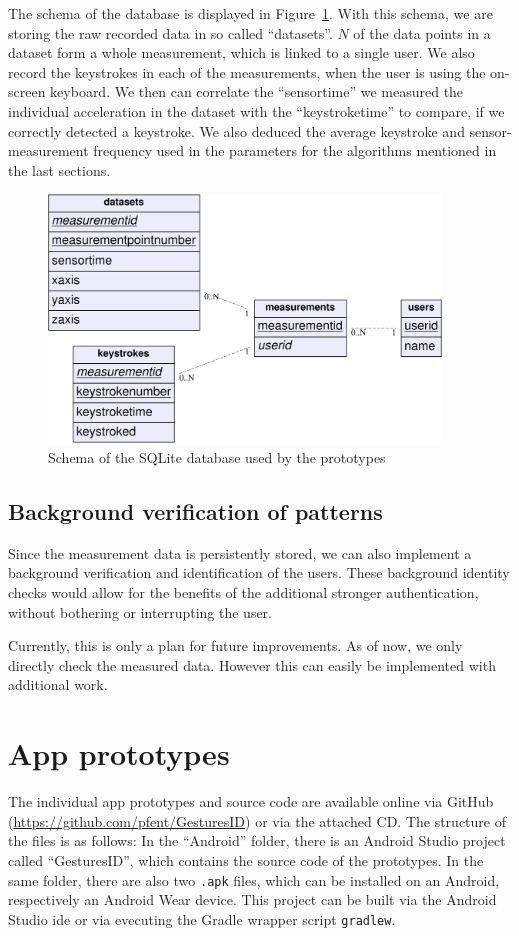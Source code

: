 The schema of the database is displayed in Figure~\ref{fig:dbschema}. With this schema, we are  storing the raw recorded data in so called ``datasets''. $N$ of the data points in a dataset form a whole measurement, which is linked to a single user. We also record the keystrokes in each of the measurements, when the user is using the on-screen keyboard. We then can correlate the ``sensortime'' we measured the individual acceleration in the dataset with the ``keystroketime'' to compare, if we correctly detected a keystroke. We also deduced the average keystroke and sensor-measurement frequency used in the parameters for the algorithms mentioned in the last sections.
\begin{figure}
    \centering
    \includegraphics[width=0.93\textwidth]{figures/databaseschema.png}
    \caption{Schema of the SQLite database used by the prototypes}
    \label{fig:dbschema}
\end{figure}

\subsection{Background verification of patterns}
Since the measurement data is persistently stored, we can also implement a background verification and identification of the users. These background identity checks would allow for the benefits of the additional stronger authentication, without bothering or interrupting the user.

Currently, this is only a plan for future improvements. As of now, we only directly check the measured data. However this can easily be implemented with additional work.
\section{App prototypes}
The individual app prototypes and source code are available online via GitHub (\url{https://github.com/pfent/GesturesID}) or via the attached CD. The structure of the files is as follows: In the ``Android'' folder, there is an Android Studio project called ``GesturesID'', which contains the source code of the prototypes. In the same folder, there are also two \lstinline$.apk$ files, which can be installed on an Android, respectively an Android Wear device. This project can be built via the Android Studio \gls{ide} or via evecuting the Gradle wrapper script \lstinline$gradlew$.

